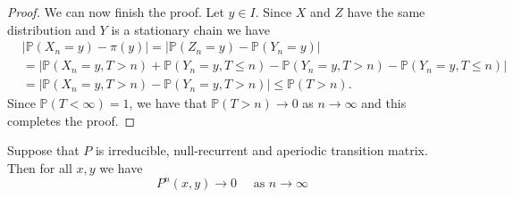 \documentclass[a4paper,11pt]{article}
\begin{document}
\begin{proof}
    We can now finish the proof. Let $y \in I$. Since $X$ and $Z$ have the same distribution and $Y$ is a stationary chain we have
    \[
    \begin{aligned}
    &\left|\mathbb{P}\left(X_n=y\right)-\pi(y)\right|=\left|\mathbb{P}\left(Z_n=y\right)-\mathbb{P}\left(Y_n=y\right)\right| \\
    &=\left|\mathbb{P}\left(X_n=y, T>n\right)+\mathbb{P}\left(Y_n=y, T \leq n\right)-\mathbb{P}\left(Y_n=y, T>n\right)-\mathbb{P}\left(Y_n=y, T \leq n\right)\right| \\
    &=\left|\mathbb{P}\left(X_n=y, T>n\right)-\mathbb{P}\left(Y_n=y, T>n\right)\right| \leq \mathbb{P}(T>n) .
    \end{aligned}
    \]
    Since $\mathbb{P}(T<\infty)=1$, we have that $\mathbb{P}(T>n) \rightarrow 0$ as $n \rightarrow \infty$ and this completes the proof.
\end{proof}

\begin{theorem}
    Suppose that $P$ is irreducible, null-recurrent and aperiodic transition matrix. Then for all $x, y$ we have
    \[
    P^n(x, y) \rightarrow 0 \quad \text { as } n \rightarrow \infty
    \]
\end{theorem}
\end{document}

